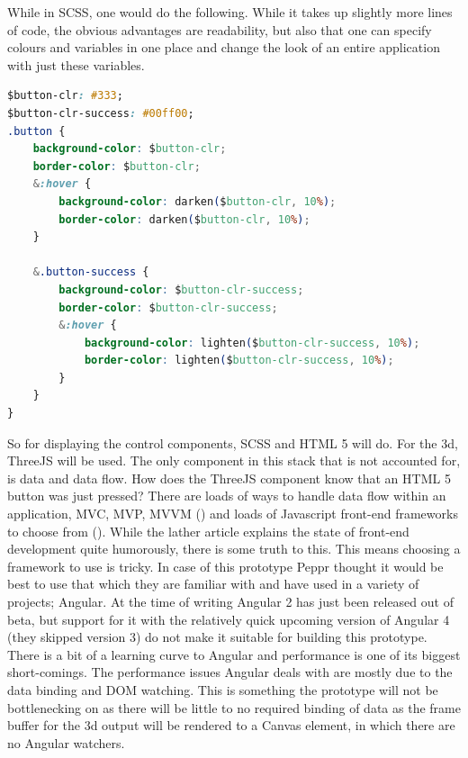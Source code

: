 \clearpage
While in SCSS, one would do the following. While it takes up slightly more lines of code, the obvious advantages are readability, but also that one can specify colours and variables in one place and change the look of an entire application with just these variables.

\begin{lstlisting}[language=CSS]
$button-clr: #333;
$button-clr-success: #00ff00;
.button {
	background-color: $button-clr;
	border-color: $button-clr;
	&:hover {
		background-color: darken($button-clr, 10%);
		border-color: darken($button-clr, 10%);
	}
	
	&.button-success {
		background-color: $button-clr-success;
		border-color: $button-clr-success;
		&:hover {
			background-color: lighten($button-clr-success, 10%);
			border-color: lighten($button-clr-success, 10%);
		}
	}
}
\end{lstlisting}

So for displaying the control components, SCSS and HTML 5 will do. For the 3d, ThreeJS will be used. The only component in this stack that is not accounted for, is data and data flow. How does the ThreeJS component know that an HTML 5 button was just pressed? There are loads of ways to handle data flow within an application, MVC, MVP, MVVM (\cite{MVCMVPMVVM}) and loads of Javascript front-end frameworks to choose from (\cite{javascriptAnno2016}). While the lather article explains the state of front-end development quite humorously, there is some truth to this. This means choosing a framework to use is tricky. In case of this prototype Peppr thought it would be best to use that which they are familiar with and have used in a variety of projects; Angular. At the time of writing Angular 2 has just been released out of beta, but support for it with the relatively quick upcoming version of Angular 4 (they skipped version 3) do not make it suitable for building this prototype.
There is a bit of a learning curve to Angular and performance is one of its biggest short-comings. The performance issues Angular deals with are mostly due to the data binding and DOM watching. This is something the prototype will not be bottlenecking on as there will be little to no required binding of data as the frame buffer for the 3d output will be rendered to a Canvas element, in which there are no Angular watchers.

